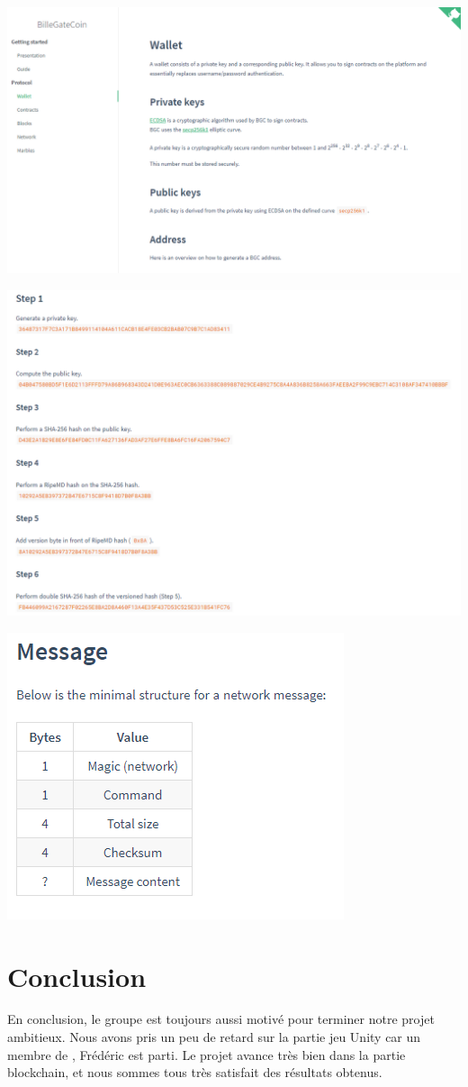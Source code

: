 \documentclass{article}
\begin{document}
\begin{center}
\includegraphics[width=0.8\linewidth]{report/docs.png}\\
\end{center}

\begin{center}
\includegraphics[width=1\linewidth]{report/protocol.png}\\[2ex]
\end{center}
\begin{center}
\includegraphics[width=0.5\linewidth]{report/message.png}\\
\end{center}

\section{Conclusion}
En conclusion, le groupe est toujours aussi motivé pour terminer notre projet ambitieux. Nous avons pris un peu de retard sur la partie jeu Unity car un membre de , Frédéric est parti. Le projet avance très bien dans la partie blockchain, et nous sommes tous très satisfait des résultats obtenus.
\end{document}

